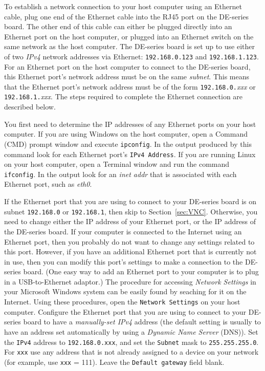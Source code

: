 \documentclass[11pt, twoside, pdftex]{article}
\begin{document}
To establish a network connection to your host computer using an Ethernet cable, plug one end 
of the Ethernet cable into the RJ45 port on the DE-series board. The other end of this cable
can either be plugged directly into an Ethernet port on the host computer, or plugged
into an Ethernet switch on the same network as the host computer. The DE-series board is set 
up to use either of two {\it IPv4} network addresses via Ethernet: \texttt{192.168.0.123} and 
\texttt{192.168.1.123}. For an Ethernet port on the host computer to connect to the DE-series
board, this Ethernet port's network address must be on the same {\it subnet}. This means 
that the Ethernet port's network address must be of the form \texttt{192.168.0.}{\it xxx} 
or \texttt{192.168.1.}{\it xxx}. The steps required to complete the Ethernet connection 
are described below.

You first need to determine the IP addresses of any Ethernet ports on your host
computer. If you are using Windows on the host computer, 
open a Command (CMD) prompt window and execute \texttt{ipconfig}. In the output produced by 
this command look for each Ethernet port's \texttt{IPv4 Address}. If you are running Linux 
on your host computer, open a Terminal window and run the command \texttt{ifconfig}. In 
the output look for an {\it inet addr} that is associated with each Ethernet port, such 
as {\it eth0}.

If the Ethernet port that you are using to connect to your DE-series board is on 
subnet \texttt{192.168.0} or \texttt{192.168.1}, then skip to 
Section~\ref{sec:VNC}.  Otherwise, you need to change either the IP address of your
Ethernet port, or the IP address of the DE-series board. If your computer is connected to
the Internet using an Ethernet port, then you probably do not want to change any
settings related to this port. However, if you have an additional Ethernet port that
is currently not in use, then you can modify this port's settings to make a connection to
the DE-series board. (One easy way to add an Ethernet port to your computer is to plug in
a USB-to-Ethernet adaptor.) The procedure for accessing {\it Network Settings} in your
Microsoft Windows system can be easily found by seaching for it on the Internet. Using these
procedures, open the \texttt{Network Settings} on your host computer. 
Configure the Ethernet port that you 
are using to connect to your DE-series board to have a {\it manually-set IPv4} 
address (the default setting is usually to have an address set automatically by using a 
{\it Dynamic Name Server} (DNS)). Set the \texttt{IPv4} address 
to \texttt{192.168.0.xxx}, and set the
\texttt{Subnet} mask to \texttt{255.255.255.0}. For \texttt{xxx} use any address that is not 
already assigned to a device on your network (for example, use \texttt{xxx} = 111).
Leave the \texttt{Default gateway} field blank.
\end{document}
